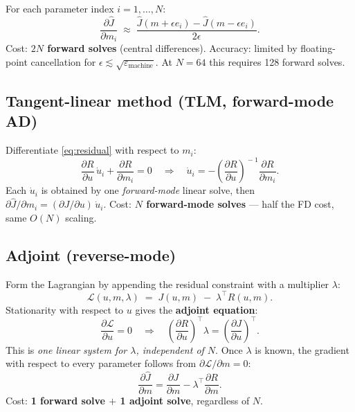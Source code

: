 \documentclass[11pt]{article}
\begin{document}
For each parameter index $i = 1,\ldots,N$:
\begin{equation}
  \frac{\partial \hat{J}}{\partial m_i}
  \;\approx\;
  \frac{\hat{J}(m + \epsilon e_i) - \hat{J}(m - \epsilon e_i)}{2\epsilon}.
  \label{eq:fd}
\end{equation}
Cost: \textbf{$2N$ forward solves} (central differences).  Accuracy:
limited by floating-point cancellation for $\epsilon \lesssim
\sqrt{\varepsilon_{\mathrm{machine}}}$.  At $N = 64$ this requires 128
forward solves.

\subsection{Tangent-linear method (TLM, forward-mode AD)}

Differentiate \eqref{eq:residual} with respect to $m_i$:
\begin{equation}
  \frac{\partial R}{\partial u} \,\dot{u}_i + \frac{\partial R}{\partial m_i}
  = 0
  \quad\Rightarrow\quad
  \dot{u}_i = -\!\left(\frac{\partial R}{\partial u}\right)^{\!-1}
              \frac{\partial R}{\partial m_i} .
  \label{eq:tlm}
\end{equation}
Each $\dot{u}_i$ is obtained by one \emph{forward-mode} linear solve, then
$\partial \hat{J}/\partial m_i = (\partial J/\partial u)\,\dot{u}_i$.
Cost: \textbf{$N$ forward-mode solves} --- half the FD cost, same
$O(N)$ scaling.

\subsection{Adjoint (reverse-mode)}
\label{sec:adjoint}

Form the Lagrangian by appending the residual constraint with a multiplier
$\lambda$:
\begin{equation}
  \mathcal{L}(u, m, \lambda)
  \;=\; J(u, m) \;-\; \lambda^\top R(u, m) .
  \label{eq:lagrangian}
\end{equation}
Stationarity with respect to $u$ gives the \textbf{adjoint equation}:
\begin{equation}
  \frac{\partial \mathcal{L}}{\partial u} = 0
  \quad\Longrightarrow\quad
  \left(\frac{\partial R}{\partial u}\right)^{\!\top} \lambda
  = \left(\frac{\partial J}{\partial u}\right)^{\!\top} .
  \label{eq:adj}
\end{equation}
This is \emph{one linear system for $\lambda$, independent of $N$}.
Once $\lambda$ is known, the gradient with respect to every parameter
follows from $\partial \mathcal{L}/\partial m = 0$:
\begin{equation}
  \frac{\partial \hat{J}}{\partial m}
  = \frac{\partial J}{\partial m}
  - \lambda^\top \frac{\partial R}{\partial m} .
  \label{eq:adjgrad}
\end{equation}
Cost: \textbf{1 forward solve $+$ 1 adjoint solve}, regardless of $N$.
\end{document}
